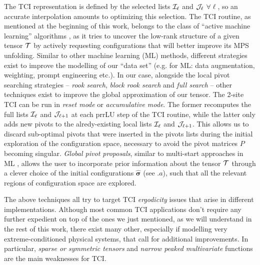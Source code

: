 The TCI representation is defined by the selected lists $\mathcal{I}_\ell$ and $\mathcal{J}_\ell$ $\forall \ell$, so an accurate interpolation amounts to optimizing this selection. The TCI routine, as mentioned at the beginning of this work, belongs to the class of ``active machine learning'' algorithms \cite{Settles2012}, as it tries to uncover the low-rank structure of a given tensor $\mathcal{T}$ by actively requesting configurations that will better improve its MPS unfolding. Similar to other machine learning (ML) methods, different strategies exist to improve the modelling of our ``data set'' (e.g. for ML: data augmentation, weighting, prompt engineering etc.).
In our case, alongside the local pivot searching strategies -- \textit{rook search}, \textit{block rook search} and \textit{full search} -- other techniques exist to improve the global approximation of our tensor. The 2-site TCI can be run in \textit{reset mode} or \textit{accumulative mode}. The former recomputes the full lists $\mathcal{I}_\ell$ and $\mathcal{J}_{\ell+1}$ at each prrLU step of the TCI routine, while the latter only adds new pivots to the alredy-existing local lists $\mathcal{I}_\ell$ and $\mathcal{J}_{\ell+1}$. This allows us to discard sub-optimal pivots that were inserted in the pivots lists during the initial exploration of the configuration space, necessary to avoid the pivot matrices $P$ becoming singular. \textit{Global pivot proposals}, similar to multi-start approaches in ML \cite{Loshchilov2017}, allows the user to incorporate prior information about the tensor $\mathcal{T}$ through a clever choice of the initial configurations $\boldsymbol{\hat  \sigma}$ (see $.a$), such that all the relevant regions of configuration space are explored.

The above techniques all try to target TCI \textit{ergodicity} issues that arise in different implementations. Although most common TCI applications don't require any further expedient on top of the ones we just mentioned, as we will understand in the rest of this work, there exist many other, especially if modelling very extreme-conditioned physical systems, that call for additional improvements. In particular, \textit{sparse or symmetric tensors} and \textit{narrow peaked multivariate} functions are the main weaknesses for TCI.


